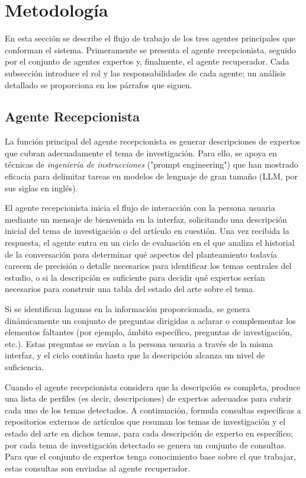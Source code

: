 \documentclass[12pt]{article}
\begin{document}
\section{Metodología}
En esta sección se describe el flujo de trabajo de los tres agentes principales que conforman el sistema. Primeramente se presenta el agente recepcionista, seguido por el conjunto de agentes expertos y, finalmente, el agente recuperador. Cada subsección introduce el rol y las responsabilidades de cada agente; un análisis detallado se proporciona en los párrafos que siguen.

\subsection{Agente Recepcionista}
La función principal del agente recepcionista es generar descripciones de expertos que cubran adecuadamente el tema de investigación. Para ello, se apoya en técnicas de \emph{ingeniería de instrucciones} ("prompt engineering") que han mostrado eficacia para delimitar tareas en modelos de lenguaje de gran tamaño (LLM, por sus siglas en inglés)\cite{Brown2020LanguageMA,qin2024largelanguagemodelsmeet}.

El agente recepcionista inicia el flujo de interacción con la persona usuaria mediante un mensaje de bienvenida en la interfaz, solicitando una descripción inicial del tema de investigación o del artículo en cuestión. Una vez recibida la respuesta, el agente entra en un ciclo de evaluación en el que analiza el historial de la conversación para determinar qué aspectos del planteamiento todavía carecen de precisión o detalle necesarios para identificar los temas centrales del estudio, o si la descripción es suficiente para decidir qué expertos serían necesarios para construir una tabla del estado del arte sobre el tema. 

Si se identifican lagunas en la información proporcionada, se genera dinámicamente un conjunto de preguntas dirigidas a aclarar o complementar los elementos faltantes (por ejemplo, ámbito específico, preguntas de investigación, etc.). Estas preguntas se envían a la persona usuaria a través de la misma interfaz, y el ciclo continúa hasta que la descripción alcanza un nivel de suficiencia.

Cuando el agente recepcionista considera que la descripción es completa, produce una lista de perfiles (es decir, descripciones) de expertos adecuados para cubrir cada uno de los temas detectados. A continuación, formula consultas específicas a repositorios externos de artículos que resuman los temas de investigación y el estado del arte en dichos temas, para cada descripción de experto en específico; por cada tema de investigación detectado se genera un conjunto de consultas. Para que el conjunto de expertos tenga conocimiento base sobre el que trabajar, estas consultas son enviadas al agente recuperador.
\end{document}
